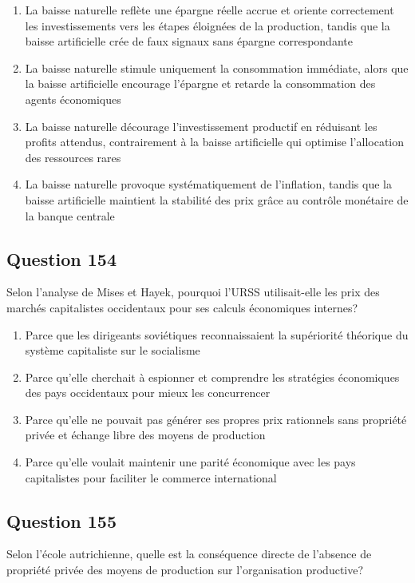 \documentclass[12pt,a4paper]{article}
\begin{document}
\begin{enumerate}[label=\Alph*., leftmargin=*]
\item La baisse naturelle reflète une épargne réelle accrue et oriente correctement les investissements vers les étapes éloignées de la production, tandis que la baisse artificielle crée de faux signaux sans épargne correspondante
\item La baisse naturelle stimule uniquement la consommation immédiate, alors que la baisse artificielle encourage l'épargne et retarde la consommation des agents économiques
\item La baisse naturelle décourage l'investissement productif en réduisant les profits attendus, contrairement à la baisse artificielle qui optimise l'allocation des ressources rares
\item La baisse naturelle provoque systématiquement de l'inflation, tandis que la baisse artificielle maintient la stabilité des prix grâce au contrôle monétaire de la banque centrale
\end{enumerate}

\bigskip


\subsection*{Question 154}
Selon l'analyse de Mises et Hayek, pourquoi l'URSS utilisait-elle les prix des marchés capitalistes occidentaux pour ses calculs économiques internes?

\begin{enumerate}[label=\Alph*., leftmargin=*]
\item Parce que les dirigeants soviétiques reconnaissaient la supériorité théorique du système capitaliste sur le socialisme
\item Parce qu'elle cherchait à espionner et comprendre les stratégies économiques des pays occidentaux pour mieux les concurrencer
\item Parce qu'elle ne pouvait pas générer ses propres prix rationnels sans propriété privée et échange libre des moyens de production
\item Parce qu'elle voulait maintenir une parité économique avec les pays capitalistes pour faciliter le commerce international
\end{enumerate}

\bigskip


\subsection*{Question 155}
Selon l'école autrichienne, quelle est la conséquence directe de l'absence de propriété privée des moyens de production sur l'organisation productive?
\end{document}
